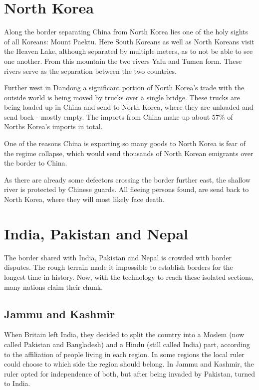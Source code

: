 \documentclass[conference]{IEEEtran}
\begin{document}
	\section{North Korea}
	Along the border separating China from North Korea lies one of the holy sights of all Koreans: Mount Paektu. \cite{theIndianExpress_explainedWhatIsTheSignificanceOfMtPeaktuForKinJongUn} Here South Koreans as well as North Koreans visit the Heaven Lake, although separated by multiple meters, as to not be able to see one another. From this mountain the two rivers Yalu and Tumen form. These rivers serve as the separation between the two countries.
	
	Further west in Dandong a significant portion of North Korea's trade with the outside world is being moved by trucks over a single bridge. These trucks are being loaded up in China and send to North Korea, where they are unloaded and send back - mostly empty. The imports from China make up about 57\%\cite{wp_economyOfNorthKorea} of Norths Korea's imports in total.
	
	One of the reasons China is exporting so many goods to North Korea is fear of the regime collapse, which would send thousands of North Korean emigrants over the border to China.
	
	As there are already some defectors crossing the border further east, the shallow river is protected by Chinese guards.\cite{yp_anInconvenientBorderWhereChinaMeetsNorthKoreaABCNews} All fleeing persons found, are send back to North Korea, where they will most likely face death.
	
	\section{India, Pakistan and Nepal}
	The border shared with India, Pakistan and Nepal is crowded with border disputes. The rough terrain made it impossible to establish borders for the longest time in history. Now, with the technology to reach these isolated sections, many nations claim their chunk.
	
	\subsection{Jammu and Kashmir}
	When Britain left India, they decided to split the country into a Moslem (now called Pakistan and Bangladesh) and a Hindu (still called India) part, according to the affiliation of people living in each region. In some regions the local ruler could choose to which side the region should belong. In Jammu and Kashmir, the ruler opted for independence of both, but after being invaded by Pakistan, turned to India.
	
\end{document}

